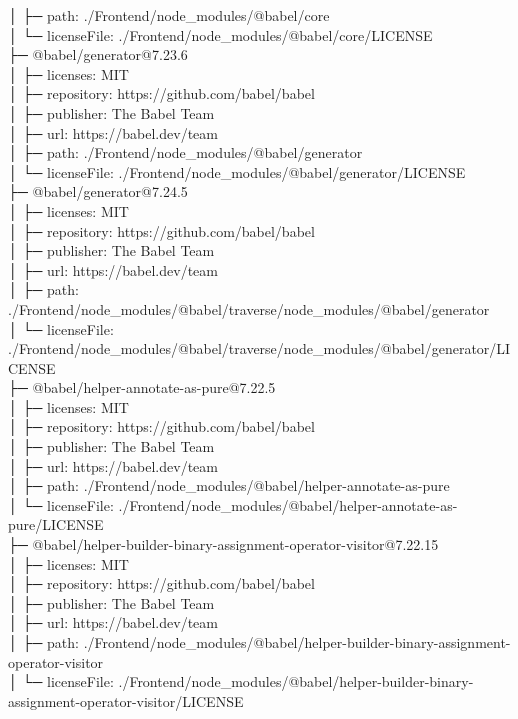 │  ├─ path: ./Frontend/node\_modules/@babel/core\\
│  └─ licenseFile: ./Frontend/node\_modules/@babel/core/LICENSE\\
├─ @babel/generator@7.23.6\\
│  ├─ licenses: MIT\\
│  ├─ repository: https://github.com/babel/babel\\
│  ├─ publisher: The Babel Team\\
│  ├─ url: https://babel.dev/team\\
│  ├─ path: ./Frontend/node\_modules/@babel/generator\\
│  └─ licenseFile: ./Frontend/node\_modules/@babel/generator/LICENSE\\
├─ @babel/generator@7.24.5\\
│  ├─ licenses: MIT\\
│  ├─ repository: https://github.com/babel/babel\\
│  ├─ publisher: The Babel Team\\
│  ├─ url: https://babel.dev/team\\
│  ├─ path: ./Frontend/node\_modules/@babel/traverse/node\_modules/@babel/generator\\
│  └─ licenseFile: ./Frontend/node\_modules/@babel/traverse/node\_modules/@babel/generator/LICENSE\\
├─ @babel/helper-annotate-as-pure@7.22.5\\
│  ├─ licenses: MIT\\
│  ├─ repository: https://github.com/babel/babel\\
│  ├─ publisher: The Babel Team\\
│  ├─ url: https://babel.dev/team\\
│  ├─ path: ./Frontend/node\_modules/@babel/helper-annotate-as-pure\\
│  └─ licenseFile: ./Frontend/node\_modules/@babel/helper-annotate-as-pure/LICENSE\\
├─ @babel/helper-builder-binary-assignment-operator-visitor@7.22.15\\
│  ├─ licenses: MIT\\
│  ├─ repository: https://github.com/babel/babel\\
│  ├─ publisher: The Babel Team\\
│  ├─ url: https://babel.dev/team\\
│  ├─ path: ./Frontend/node\_modules/@babel/helper-builder-binary-assignment-operator-visitor\\
│  └─ licenseFile: ./Frontend/node\_modules/@babel/helper-builder-binary-assignment-operator-visitor/LICENSE\\
